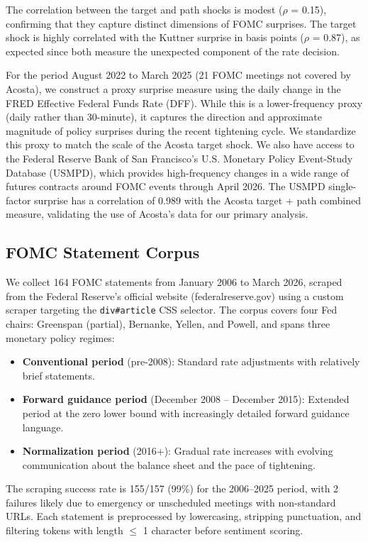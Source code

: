 The correlation between the target and path shocks is modest ($\rho$ = 0.15), confirming that they capture distinct dimensions of FOMC surprises. The target shock is highly correlated with the Kuttner surprise in basis points ($\rho$ = 0.87), as expected since both measure the unexpected component of the rate decision.

For the period August 2022 to March 2025 (21 FOMC meetings not covered by Acosta), we construct a proxy surprise measure using the daily change in the FRED Effective Federal Funds Rate (DFF). While this is a lower-frequency proxy (daily rather than 30-minute), it captures the direction and approximate magnitude of policy surprises during the recent tightening cycle. We standardize this proxy to match the scale of the Acosta target shock. We also have access to the Federal Reserve Bank of San Francisco's U.S. Monetary Policy Event-Study Database (USMPD), which provides high-frequency changes in a wide range of futures contracts around FOMC events through April 2026. The USMPD single-factor surprise has a correlation of 0.989 with the Acosta target + path combined measure, validating the use of Acosta's data for our primary analysis.

\subsection{FOMC Statement Corpus}

We collect 164 FOMC statements from January 2006 to March 2026, scraped from the Federal Reserve's official website (federalreserve.gov) using a custom scraper targeting the \texttt{div\#article} CSS selector. The corpus covers four Fed chairs: Greenspan (partial), Bernanke, Yellen, and Powell, and spans three monetary policy regimes:

\begin{itemize}
\item \textbf{Conventional period} (pre-2008): Standard rate adjustments with relatively brief statements.
\item \textbf{Forward guidance period} (December 2008 -- December 2015): Extended period at the zero lower bound with increasingly detailed forward guidance language.
\item \textbf{Normalization period} (2016+): Gradual rate increases with evolving communication about the balance sheet and the pace of tightening.
\end{itemize}

The scraping success rate is 155/157 (99\%) for the 2006--2025 period, with 2 failures likely due to emergency or unscheduled meetings with non-standard URLs. Each statement is preprocessed by lowercasing, stripping punctuation, and filtering tokens with length $\leq$ 1 character before sentiment scoring.

